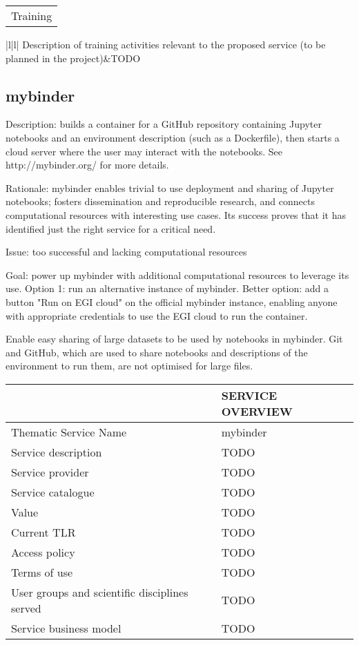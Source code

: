 \begin{tabular}{|l|}
\hline
Training
\hline
\end{tabular}
\begin{tabular}{|l|l|}
\hline
Description of training activities relevant to the proposed service (to be planned in the project)&TODO
\hline


\subsection{mybinder}

Description: builds a container for a GitHub repository containing Jupyter
notebooks and an environment description (such as a Dockerfile), then starts a
cloud server where the user may interact with the notebooks. See http://mybinder.org/
for more details.

Rationale: mybinder enables trivial to use deployment and sharing of
Jupyter notebooks; fosters dissemination and reproducible research,
and connects computational resources with interesting use cases.
Its success proves that it has identified just the right service for
a critical need.

Issue: too successful and lacking computational resources

Goal: power up mybinder with additional computational resources to
leverage its use. Option 1: run an alternative instance of mybinder.
Better option: add a button "Run on EGI cloud" on the official
mybinder instance, enabling anyone with appropriate credentials to use
the EGI cloud to run the container.

Enable easy sharing of large datasets to be used by notebooks in mybinder. Git
and GitHub, which are used to share notebooks and descriptions of the
environment to run them, are not optimised for large files.


\begin{tabular}{|l|l|}
\hline
 & SERVICE OVERVIEW\\
\hline
Thematic Service Name&mybinder\\
\hline
Service description&TODO\\
\hline
Service provider&TODO\\
\hline
Service catalogue&TODO\\
\hline
Value&TODO\\
\hline
Current TLR&TODO\\
\hline
Access policy&TODO\\
\hline
Terms of use&TODO\\
\hline
User groups and scientific disciplines served&TODO\\
\hline
Service business model&TODO\\
\hline
\end{tabular}


\end{tabular}
